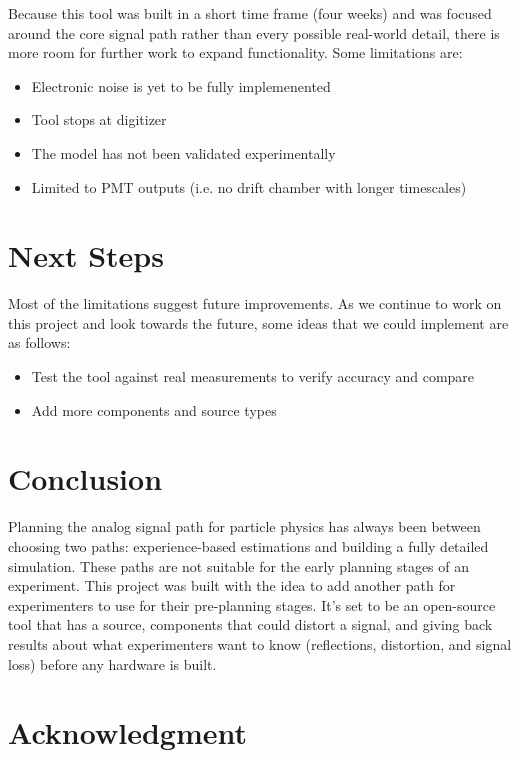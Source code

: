 \documentclass[10pt]{article}
\begin{document}
Because this tool was built in a short time frame (four weeks) and was focused around the core signal path rather than every possible real-world detail, there is more room for further work to expand functionality.
Some limitations are:
\begin{itemize}
    \item Electronic noise is yet to be fully implemenented
    \item Tool stops at digitizer 
    \item The model has not been validated experimentally
    \item Limited to PMT outputs (i.e. no drift chamber with longer timescales)
\end{itemize}
\section{Next Steps}

Most of the limitations suggest future improvements.
As we continue to work on this project and look towards the future, some ideas that we could implement are as follows:
\begin{itemize}
    \item Test the tool against real measurements to verify accuracy and compare
    \item Add more components and source types
\end{itemize}
\section{Conclusion}

Planning the analog signal path for particle physics has always been between choosing two paths: experience-based estimations and building a fully detailed simulation. These paths are not suitable for the early planning stages of an experiment. This project was built with the idea to add another path for experimenters to use for their pre-planning stages. It's set to be an open-source tool that has a source, components that could distort a signal, and giving back results about what experimenters want to know (reflections, distortion, and signal loss) before any hardware is built.

\section{Acknowledgment}
\end{document}
